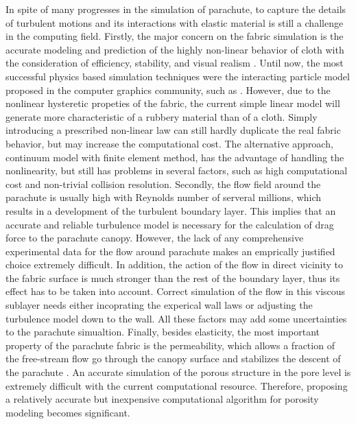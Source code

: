 In spite of many progresses in the simulation of parachute, to capture the
details of turbulent motions and its interactions with elastic material is
still a challenge in the computing field.  Firstly, the major concern on the
fabric simulation is the accurate modeling and prediction of the highly
non-linear behavior of cloth with the consideration of efficiency, stability,
and visual realism \cite{Choi2005}. Until now, the most successful physics
based simulation techniques were the interacting particle model proposed in the
computer graphics community, such as \cite{Baraff1998, Choi2002}. However, due
to the nonlinear hysteretic propeties of the fabric, the current simple linear
model will generate more characteristic of a rubbery material than of a cloth.
Simply introducing a prescribed non-linear law can still hardly duplicate the
real fabric behavior, but may increase the computational cost. The alternative
approach, continuum model with finite element method, has the advantage of
handling the nonlinearity, but still has problems in several factors, such as
high computational cost and non-trivial collision resolution.  Secondly, the
flow field around the parachute is usually high with Reynolds number of
serveral millions, which results in a development of the turbulent boundary
layer.  This implies that an accurate and reliable turbulence model is
necessary for the calculation of drag force to the parachute canopy. However,
the lack of any comprehensive experimental data for the flow around parachute
makes an emprically justified choice extremely difficult. In addition, the
action of the flow in direct vicinity to the fabric surface is much stronger
than the rest of the boundary layer, thus its effect has to be taken into
account. Correct simulation of the flow in this viscous sublayer needs either
incoprating the experical wall laws or adjusting the turbulence model down to
the wall. All these factors may add some uncertainties to the parachute
simualtion.  Finally, besides elasticity, the most important property of the
parachute fabric is the permeability, which allows a fraction of the
free-stream flow go through the canopy surface and stabilizes the descent of
the parachute \cite{Johari2005}. An accurate simulation of the porous structure
in the pore level is extremely difficult with the current computational
resource. Therefore, proposing a relatively accurate but inexpensive
computational algorithm for porosity modeling becomes significant.

